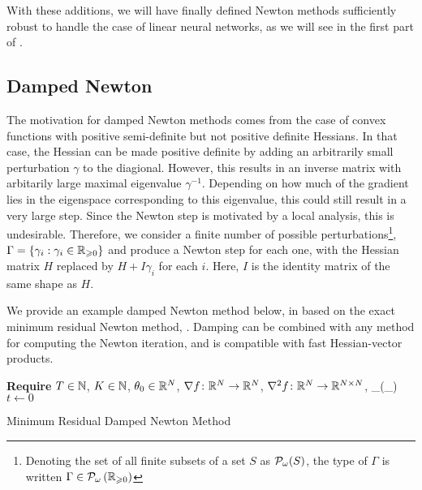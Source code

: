 \documentclass[../../thesis.tex]{subfiles}
\begin{document}
With these additions,
we will have finally defined Newton methods
sufficiently robust to handle the case of
linear neural networks, as we will see in the first part of
.


\subsection{Damped Newton}

The motivation for damped Newton methods
comes from the case of convex functions
with positive semi-definite but not positive definite Hessians.
In that case,
the Hessian can be made positive definite
by adding an arbitrarily small
perturbation $\gamma$ to the diagional.
However, this results in an inverse matrix
with arbitarily large maximal eigenvalue $\gamma^{-1}$.
Depending on how much of the gradient lies in the eigenspace
corresponding to this eigenvalue,
this could still result in
a very large step.
Since the Newton step is motivated by a local analysis,
this is undesirable.
Therefore,
we consider a finite number of possible perturbations\footnote{%
Denoting the set of all finite subsets of a set $S$ as
${\mathcal{P}}_\omega(S)$, the type of $\Gamma$ is written
$\Gamma \in {\mathcal{P}}_\omega\left(\mathbb{R}_{\geqslant 0}\right)$},
$\Gamma = \left\{\gamma_i : \gamma_i \in \mathbb{R}_{\geqslant 0}\right\}$
and produce a Newton step for each one,
with the Hessian matrix $H$ replaced by
$H + I\gamma_i$ for each $i$.
Here, $I$ is the identity matrix of
the same shape as $H$.

We provide an example damped Newton method below,
in 
based on the exact minimum residual Newton method,
.
Damping can be combined with any method for computing
the Newton iteration, and is compatible
with fast Hessian-vector products.
\\
\begin{algorithm}[h]
    \SetAlgoLined{}
    \textbf{Require}
    $T\in \mathbb{N}$, $K \in \mathbb{N}$, $\theta_0 \in \mathbb{R}^N$,
    $\nabla{f}\colon\mathbb{R}^N\to\mathbb{R}^N$,
    $\nabla^2{f}\colon\mathbb{R}^N\to\mathbb{R}^{N\times N}$,
    \Gamma \in \cP_\omega(\R_{})\\
    $t \leftarrow 0$\\
    \caption{Minimum Residual Damped Newton Method}
\end{algorithm}
\end{document}
